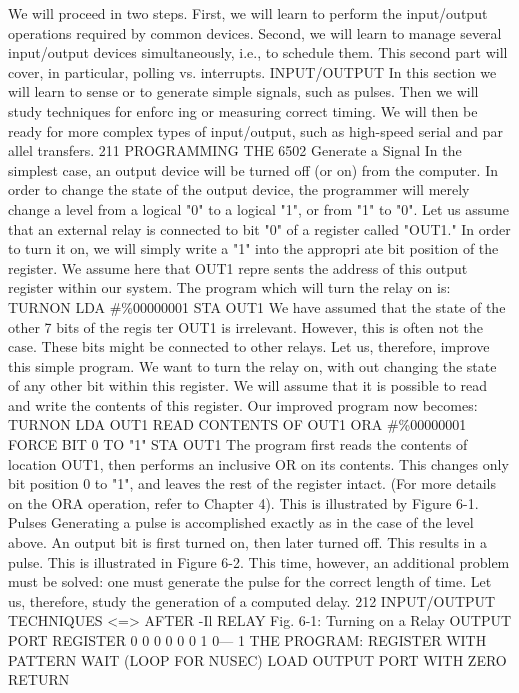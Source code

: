 \documentclass{book}
\begin{document}
We will proceed in two steps. First, we will learn to perform the
input/output operations required by common devices. Second, we
will learn to manage several input/output devices simultaneously,
i.e., to schedule them. This second part will cover, in particular,
polling vs. interrupts.
INPUT/OUTPUT
In this section we will learn to sense or to generate simple
signals, such as pulses. Then we will study techniques for enforc
ing or measuring correct timing. We will then be ready for more
complex types of input/output, such as high-speed serial and par
allel transfers.
211
PROGRAMMING THE 6502
Generate a Signal
In the simplest case, an output device will be turned off (or on)
from the computer. In order to change the state of the output
device, the programmer will merely change a level from a logical
"0" to a logical "1", or from "1" to "0". Let us assume that an
external relay is connected to bit "0" of a register called "OUT1."
In order to turn it on, we will simply write a "1" into the appropri
ate bit position of the register. We assume here that OUT1 repre
sents the address of this output register within our system. The
program which will turn the relay on is:
TURNON LDA #\%00000001
STA OUT1
We have assumed that the state of the other 7 bits of the regis
ter OUT1 is irrelevant. However, this is often not the case.
These bits might be connected to other relays. Let us, therefore,
improve this simple program. We want to turn the relay on, with
out changing the state of any other bit within this register. We
will assume that it is possible to read and write the contents of
this register. Our improved program now becomes:
TURNON LDA OUT1 READ CONTENTS OF OUT1
ORA #\%00000001 FORCE BIT 0 TO "1"
STA OUT1
The program first reads the contents of location OUT1, then
performs an inclusive OR on its contents. This changes only bit
position 0 to "1", and leaves the rest of the register intact. (For
more details on the ORA operation, refer to Chapter 4). This is
illustrated by Figure 6-1.
Pulses
Generating a pulse is accomplished exactly as in the case of
the level above. An output bit is first turned on, then later turned
off. This results in a pulse. This is illustrated in Figure 6-2. This
time, however, an additional problem must be solved: one must
generate the pulse for the correct length of time. Let us, therefore,
study the generation of a computed delay.
212
INPUT/OUTPUT TECHNIQUES
<=>
AFTER
-Il RELAY
Fig. 6-1: Turning on a Relay
OUTPUT PORT
REGISTER
0
0
0
0
0
0
1
0— 1
THE PROGRAM:
REGISTER WITH PATTERN
WAIT (LOOP FOR NUSEC)
LOAD OUTPUT PORT WITH ZERO
RETURN
\end{document}
